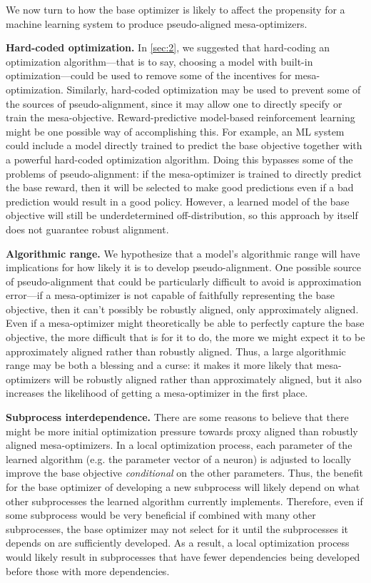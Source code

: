 \documentclass[
  onecolumn,
  natbib,
]{miri-tech-article}
\begin{document}
We now turn to how the base optimizer is likely to affect the propensity for a machine learning system to produce pseudo-aligned mesa-optimizers.

\textbf{Hard-coded optimization.} In \cref{sec:2}, we suggested that hard-coding an optimization algorithm---that is to say, choosing a model with built-in optimization---could be used to remove some of the incentives for mesa-optimization. Similarly, hard-coded optimization may be used to prevent some of the sources of pseudo-alignment, since it may allow one to directly specify or train the mesa-objective. Reward-predictive model-based reinforcement learning might be one possible way of accomplishing this.\cite{imagination_planners} For example, an ML system could include a model directly trained to predict the base objective together with a powerful hard-coded optimization algorithm. Doing this bypasses some of the problems of pseudo-alignment: if the mesa-optimizer is trained to directly predict the base reward, then it will be selected to make good predictions even if a bad prediction would result in a good policy. However, a learned model of the base objective will still be underdetermined off-distribution, so this approach by itself does not guarantee robust alignment.

\textbf{Algorithmic range.} We hypothesize that a model's algorithmic range will have implications for how likely it is to develop pseudo-alignment. One possible source of pseudo-alignment that could be particularly difficult to avoid is approximation error---if a mesa-optimizer is not capable of faithfully representing the base objective, then it can't possibly be robustly aligned, only approximately aligned. Even if a mesa-optimizer might theoretically be able to perfectly capture the base objective, the more difficult that is for it to do, the more we might expect it to be approximately aligned rather than robustly aligned. Thus, a large algorithmic range may be both a blessing and a curse: it makes it more likely that mesa-optimizers will be robustly aligned rather than approximately aligned, but it also increases the likelihood of getting a mesa-optimizer in the first place.

\textbf{Subprocess interdependence.} There are some reasons to believe that there might be more initial optimization pressure towards proxy aligned than robustly aligned mesa-optimizers. In a local optimization process, each parameter of the learned algorithm (e.g. the parameter vector of a neuron) is adjusted to locally improve the base objective \textit{conditional} on the other parameters. Thus, the benefit for the base optimizer of developing a new subprocess will likely depend on what other subprocesses the learned algorithm currently implements. Therefore, even if some subprocess would be very beneficial if combined with many other subprocesses, the base optimizer may not select for it until the subprocesses it depends on are sufficiently developed. As a result, a local optimization process would likely result in subprocesses that have fewer dependencies being developed before those with more dependencies.
\end{document}
